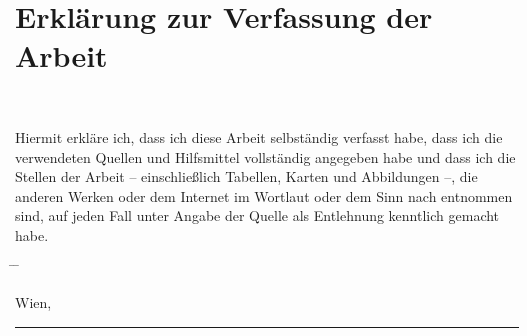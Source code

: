 \chapter*{Erklärung zur Verfassung der Arbeit}

\tuinfthesisauthor\\
\tuinfthesisauthoraddress

\vspace*{1.2cm}

Hiermit erkläre ich, dass ich diese Arbeit selbständig verfasst habe, 
dass ich die verwendeten Quellen und Hilfsmittel vollständig angegeben 
habe und dass ich die Stellen der Arbeit -- einschließlich Tabellen, 
Karten und Abbildungen --, die anderen Werken oder dem Internet im 
Wortlaut oder dem Sinn nach entnommen sind, auf jeden Fall unter Angabe 
der Quelle als Entlehnung kenntlich gemacht habe.\\

\vspace*{2cm}
\begin{tabbing}%
    \hspace{58mm} \= \hspace{28mm} \= \hspace{58mm} \kill
    \begin{minipage}[b][0.5cm][b]{58mm}
	\centering Wien, \tuinfthesisdate
    \end{minipage}
    \> \>
    {\raggedright\rule{58mm}{0.5pt}} \\
    \> \>
    \begin{minipage}[t][0.5cm][t]{58mm}
        \vspace{0pt}
	\centering \tuinfthesisauthor
    \end{minipage}
\end{tabbing}

